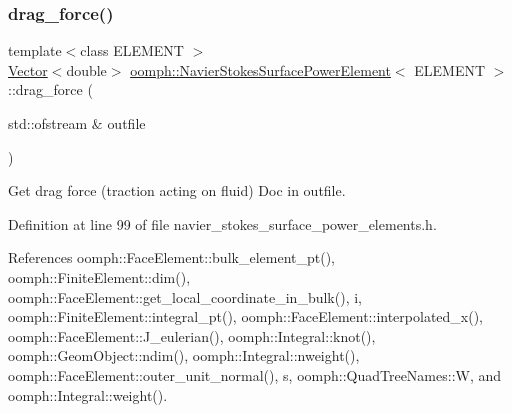 \subsubsection{\texorpdfstring{drag\+\_\+force()}{drag\_force()}\hspace{0.1cm}{\footnotesize\ttfamily [2/2]}}
{\footnotesize\ttfamily template$<$class E\+L\+E\+M\+E\+NT $>$ \\
\hyperlink{classoomph_1_1Vector}{Vector}$<$double$>$ \hyperlink{classoomph_1_1NavierStokesSurfacePowerElement}{oomph\+::\+Navier\+Stokes\+Surface\+Power\+Element}$<$ E\+L\+E\+M\+E\+NT $>$\+::drag\+\_\+force (\begin{DoxyParamCaption}\item[{std\+::ofstream \&}]{outfile }\end{DoxyParamCaption})\hspace{0.3cm}{\ttfamily [inline]}}



Get drag force (traction acting on fluid) Doc in outfile. 



Definition at line 99 of file navier\+\_\+stokes\+\_\+surface\+\_\+power\+\_\+elements.\+h.



References oomph\+::\+Face\+Element\+::bulk\+\_\+element\+\_\+pt(), oomph\+::\+Finite\+Element\+::dim(), oomph\+::\+Face\+Element\+::get\+\_\+local\+\_\+coordinate\+\_\+in\+\_\+bulk(), i, oomph\+::\+Finite\+Element\+::integral\+\_\+pt(), oomph\+::\+Face\+Element\+::interpolated\+\_\+x(), oomph\+::\+Face\+Element\+::\+J\+\_\+eulerian(), oomph\+::\+Integral\+::knot(), oomph\+::\+Geom\+Object\+::ndim(), oomph\+::\+Integral\+::nweight(), oomph\+::\+Face\+Element\+::outer\+\_\+unit\+\_\+normal(), s, oomph\+::\+Quad\+Tree\+Names\+::W, and oomph\+::\+Integral\+::weight().

\mbox{\label{classoomph_1_1NavierStokesSurfacePowerElement_a69225bd43c0e0552beeab3013a59968e}} 

